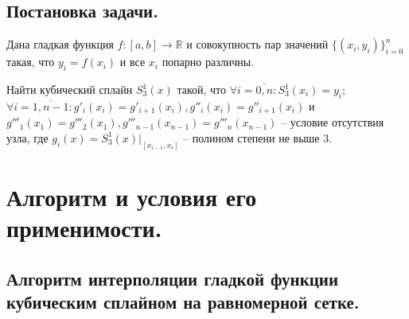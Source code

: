 \documentclass[a4paper, 12pt]{article}
\begin{document}
	\subsection{Постановка задачи.}
	
	Дана гладкая функция $f:[a,b]\rightarrow \mathbb{R}$ и совокупность пар значений $\{(x_i,y_i)\}_{i=0}^n$ такая, что $y_i=f(x_i)$ и все $x_i$ попарно различны. 
	
	Найти кубический сплайн $S_3^1(x)$ такой, что $\forall i=\overline{0,n} : S_3^1(x_i)=y_i$; $\forall i=\overline{1,n-1}: g'_i(x_i) = g'_{i+1}(x_i), g''_i(x_i) = g''_{i+1}(x_i)$ и $g'''_1(x_1)=g'''_2(x_1), g'''_{n-1}(x_{n-1})=g'''_n(x_{n-1})$ -- условие отсутствия узла, где $g_i(x)=S_3^1(x)|_{[x_{i-1},x_i]}$ -- полином степени не выше 3.
	
	\section{Алгоритм и условия его применимости.}
	
	\subsection{Алгоритм интерполяции гладкой функции кубическим сплайном на равномерной сетке.}
	
\end{document}
